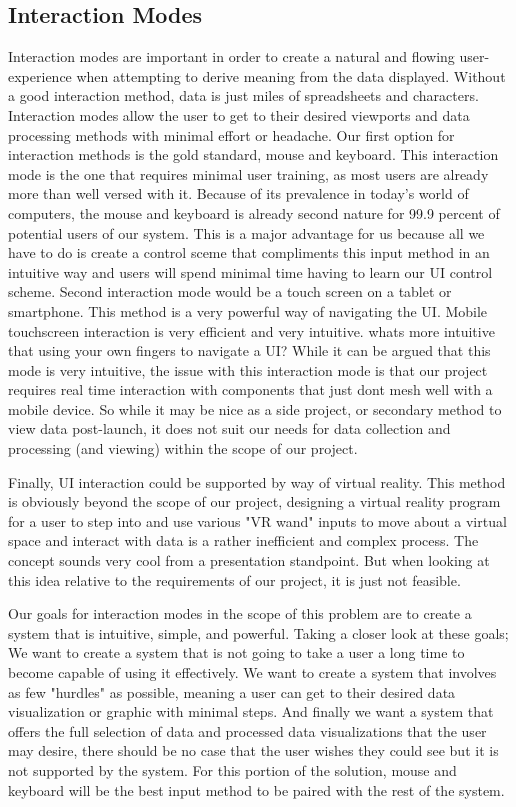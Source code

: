 \documentclass[10pt,draftclsnofoot,onecolumn]{IEEEtran}
\begin{document}
\subsection{Interaction Modes}
Interaction modes are important in order to create a natural and flowing user-experience when attempting to derive meaning from the data displayed. Without a good interaction method, data is just miles of spreadsheets and characters. Interaction modes allow the user to get to their desired viewports and data processing methods with minimal effort or headache.
Our first option for interaction methods is the gold standard, mouse and keyboard. This interaction mode is the one that requires minimal user training, as most users are already more than well versed with it. Because of its prevalence in today's world of computers, the mouse and keyboard is already second nature for 99.9 percent of potential users of our system. This is a major advantage for us because all we have to do is create a control sceme that compliments this input method in an intuitive way and users will spend minimal time having to learn our UI control scheme.
Second interaction mode would be a touch screen on a tablet or smartphone. This method is a very powerful way of navigating the UI. Mobile touchscreen interaction is very efficient and very intuitive. whats more intuitive that using your own fingers to navigate a UI? While it can be argued that this mode is very intuitive, the issue with this interaction mode is that our project requires real time interaction with components that just dont mesh well with a mobile device. So while it may be nice as a side project, or secondary method to view data post-launch, it does not suit our needs for data collection and processing (and viewing) within the scope of our project.\par
Finally, UI interaction could be supported by way of virtual reality. This method is obviously beyond the scope of our project, designing a virtual reality program for a user to step into and use various "VR wand" inputs to move about a virtual space and interact with data is a rather inefficient and complex process. The concept sounds very cool from a presentation standpoint. But when looking at this idea relative to the requirements of our project, it is just not feasible.\par
Our goals for interaction modes in the scope of this problem are to create a system that is intuitive, simple, and powerful. Taking a closer look at these goals; We want to create a system that is not going to take a user a long time to become capable of using it effectively. We want to create a system that involves as few "hurdles" as possible, meaning a user can get to their desired data visualization or graphic with minimal steps. And finally we want a system that offers the full selection of data and processed data visualizations that the user may desire, there should be no case that the user wishes they could see but it is not supported by the system. For this portion of the solution, mouse and keyboard will be the best input method to be paired with the rest of the system. \par
\end{document}
